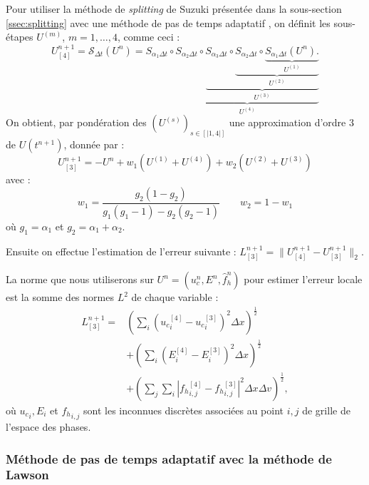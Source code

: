 Pour utiliser la méthode de \emph{splitting} de Suzuki présentée dans la sous-section \ref{ssec:splitting} avec une méthode de pas de temps adaptatif \cite{Blanes:2019}, on définit les sous-étapes $U^{(m)}$, $m=1,\dots,4$, comme ceci :
$$
  U^{n+1}_{[4]} = \mathcal{S}_{\Delta t}(U^n)
    = S_{\alpha_1\Delta t}
      \circ \underbrace{ S_{\alpha_2\Delta t}
      \circ \underbrace{ S_{\alpha_3\Delta t}
      \circ \underbrace{ S_{\alpha_2\Delta t}
      \circ \underbrace{ S_{\alpha_1\Delta t} (U^n). }_{U^{(1)}}
                                                    }_{U^{(2)}}
                                                    }_{U^{(3)}}
                                                    }_{U^{(4)}}
$$
On obtient, par pondération des $\left(U^{(s)}\right)_{s\in [\!|1,4|\!] }$ une  approximation d'ordre $3$ de $U(t^{n+1})$, donnée par :
$$
  U^{n+1}_{[3]} = -U^n + w_1(U^{(1)} + U^{(4)}) + w_2(U^{(2)} + U^{(3)})
$$
avec :
$$
  w_1 = \frac{g_2(1-g_2)}{g_1(g_1-1)-g_2(g_2-1)} \qquad w_2 = 1-w_1
$$
où $g_1 = \alpha_1$ et $g_2 = \alpha_1 + \alpha_2$.

Ensuite on effectue l'estimation de l'erreur suivante : $L^{n+1}_{[3]} = \| U^{n+1}_{[4]}-U^{n+1}_{[3]} \|_2$.

La norme que nous utiliserons sur $U^n = (u_c^n,E^n,\hat{f}_h^n)$ pour estimer l'erreur locale est la somme des normes $L^2$ de chaque variable :
\begin{equation}
  \begin{aligned}
  L^{n+1}_{[3]} = & \left(\sum_i (\left.u_c\right.^{[4]}_i-\left.u_c\right.^{[3]}_i)^2\Delta x\right)^{\frac{1}{2}} \\
                & + \left(\sum_i (\left.E\right.^{[4]}_i-\left.E\right.^{[3]}_i)^2\Delta x\right)^{\frac{1}{2}}     \\
                & + \left(\sum_j \sum_i \left|\left.f_h\right.^{[4]}_{i,j}-\left.f_h\right.^{[3]}_{i,j}\right|^2\Delta x\Delta v\right)^{\frac{1}{2}}, 
  \end{aligned}
  \label{local_error}
\end{equation}
où $\left.u_c\right._i, \left.E\right._i$ et $\left.f_h\right._{i,j}$ sont les inconnues discrètes associées au point $i,j$ de grille de l'espace des phases.


\subsubsection{Méthode de pas de temps adaptatif avec la méthode de Lawson}

